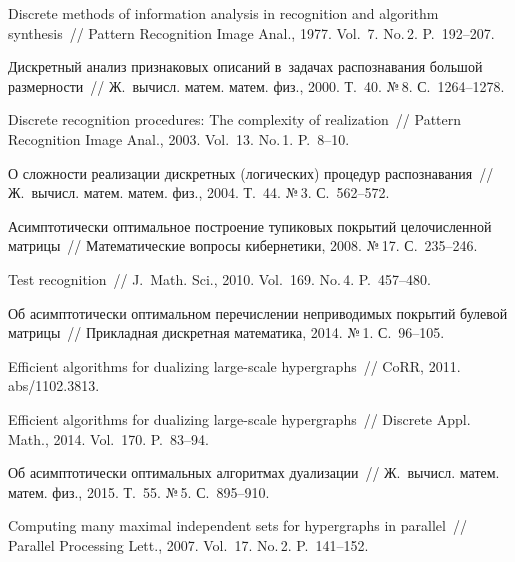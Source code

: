 \begin{multicols}{2}
{{\begin{thebibliography}{99}
      Discrete methods of information analysis in recognition and
    algorithm synthesis~//
      Pattern Recognition Image Anal., 1977.
    Vol.~7. No.\,2. P.~192--207.
    
Дискретный анализ признаковых описаний в~задачах распознавания большой размерности~//
      Ж.\ вычисл. матем. матем. физ., 2000.
    Т.~40. №\,8. С.~1264--1278.
    
      Discrete recognition procedures: The complexity of realization~//
      Pattern Recognition Image Anal., 2003.
    Vol.~13. No.\,1. P.~8--10.
    
      О сложности реализации дискретных (логических) процедур распознавания~//
   Ж.\ вычисл. матем. матем. физ., 2004.
    Т.~44. №\,3. С.~562--572.
    
      Асимптотически оптимальное построение тупиковых покрытий целочисленной матрицы~//
      Математические вопросы кибернетики, 2008.
    №\,17. С.~235--246.
    
    
    
      Test recognition~//
      J.~Math. Sci., 2010.
    Vol.~169. No.\,4. P.~457--480.
    
      Об асимптотически оптимальном перечислении неприводимых покрытий булевой матрицы~//
      Прикладная дискретная математика, 2014.
    №\,1. С.~96--105.
    
    \pagebreak
    
      Efficient algorithms for dualizing large-scale hypergraphs~//
      CoRR, 2011. abs/1102.3813.
    
      Efficient algorithms for dualizing large-scale hypergraphs~//
      Discrete Appl. Math., 2014.
    Vol.~170. P.~83--94.
    
      Об асимптотически оптимальных алгоритмах дуализации~//
   Ж.\ вычисл. матем. матем. физ., 2015.
    Т.~55. №\,5. С.~895--910.
    
      Computing many maximal independent sets for hypergraphs in
    parallel~//
      Parallel Processing Lett., 2007.
    Vol.~17. No.\,2. P.~141--152.
    

\end{thebibliography}}}
\end{multicols}
